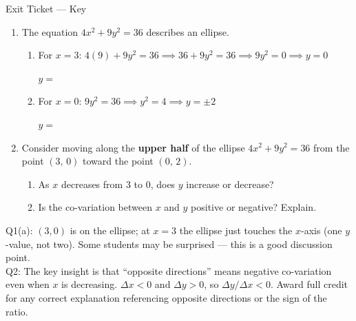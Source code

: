\documentclass[10pt]{article}
\begin{document}
\namedateperiod

\vspace{0.12in}

\begin{notesbox}{Exit Ticket --- Key}
\begin{enumerate}[leftmargin=1.5em, itemsep=8pt]

\item The equation $4x^2 + 9y^2 = 36$ describes an ellipse.

\begin{enumerate}[leftmargin=1.2em, itemsep=6pt]
    \item[(a)] For $x = 3$: \quad $4(9) + 9y^2 = 36 \implies 36 + 9y^2 = 36 \implies 9y^2 = 0 \implies y = 0$

    \vspace{0.3in}
    $y = $ 

    \item[(b)] For $x = 0$: \quad $9y^2 = 36 \implies y^2 = 4 \implies y = \pm 2$

    \vspace{0.3in}
    $y = $ 
\end{enumerate}

\item Consider moving along the \textbf{upper half} of the ellipse $4x^2 + 9y^2 = 36$
from the point $(3,\, 0)$ toward the point $(0,\, 2)$.

\begin{enumerate}[leftmargin=1.2em, itemsep=6pt]
    \item[(a)] As $x$ decreases from 3 to 0, does $y$ increase or decrease?

    \vspace{0.1in}

    \item[(b)] Is the co-variation between $x$ and $y$ positive or negative? Explain.

    \vspace{0.3in}
\end{enumerate}

\end{enumerate}
\end{notesbox}

\begin{teachernote}
Q1(a): $(3,0)$ is on the ellipse; at $x=3$ the ellipse just touches the $x$-axis (one $y$-value, not two). Some students may be surprised --- this is a good discussion point.\\[3pt]
Q2: The key insight is that ``opposite directions'' means negative co-variation even when $x$ is decreasing. $\Delta x < 0$ and $\Delta y > 0$, so $\Delta y/\Delta x < 0$. Award full credit for any correct explanation referencing opposite directions or the sign of the ratio.
\end{teachernote}
\end{document}
